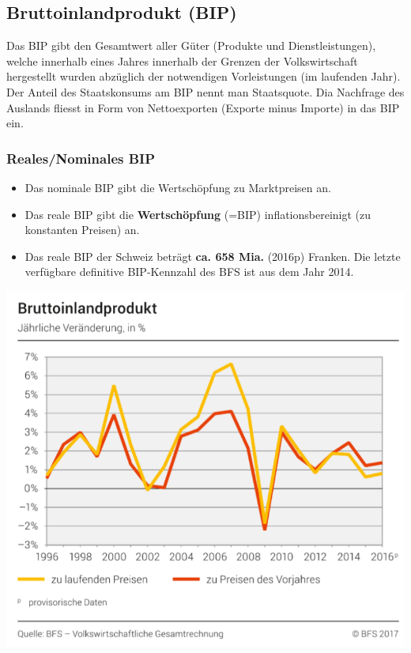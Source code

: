 \begin{multicols}{2}
\subsection{Bruttoinlandprodukt (BIP)}
Das BIP gibt den Gesamtwert aller Güter (Produkte und Dienstleistungen), welche innerhalb eines Jahres innerhalb der Grenzen der Volkswirtschaft hergestellt wurden abzüglich der notwendigen Vorleistungen (im laufenden Jahr).\\
Der Anteil des Staatskonsums am BIP nennt man Staatsquote. Dia Nachfrage des Auslands fliesst in Form von Nettoexporten (Exporte minus Importe) in das BIP ein.

\subsubsection{Reales/Nominales BIP}
\begin{itemize}
	\item Das nominale BIP gibt die Wertschöpfung zu Marktpreisen an.
	\item Das reale BIP gibt die \textbf{Wertschöpfung} (=BIP) inflationsbereinigt (zu konstanten Preisen) an.
	\item Das reale BIP der Schweiz beträgt \textbf{ca. 658 Mia.} (2016p) Franken. Die letzte verfügbare definitive BIP-Kennzahl des BFS ist aus dem Jahr 2014.
\end{itemize}
\vfill\null
\columnbreak
\includegraphics[width=\linewidth]{images/realbip.png}	
\end{multicols}

